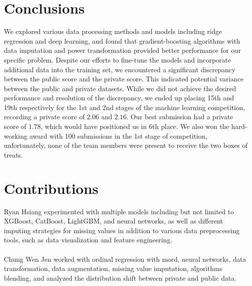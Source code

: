 \documentclass{article}
\begin{document}
\section{Conclusions}
We explored various data processing methods and models including ridge regression and deep learning, and found that gradient-boosting algorithms with data imputation and power transformation provided better performance for our specific problem.  Despite our efforts to fine-tune the models and incorporate additional data into the training set, we encountered a significant discrepancy between the public score and the private score. This indicated potential variance between the public and private datasets. While we did not achieve the desired performance and resolution of the discrepancy, we ended up placing 15th and 19th respectively for the 1st and 2nd stages of the machine learning competition, recording a private score of $2.06$ and $2.16$. Our best submission had a private score of $1.78$, which would have positioned us in 6th place.
We also won the hard-working award with 100 submissions in the 1st stage of competition, unfortunately, none of the team members were present to receive the two boxes of treats.
\section{Contributions}
Ryan Hsiang experimented with multiple models including but not limited to XGBoost, CatBoost, LightGBM, and neural networks,  as well as different imputing strategies for missing values in addition to various data preprocessing tools, such as data visualization and feature engineering. 
\\\\
Chung Wen Jen worked with ordinal regression with mord, neural networks, data transformation, data augmentation, missing value imputation, algorithms blending, and analyzed the distribution shift between private and public data. 
\end{document}

